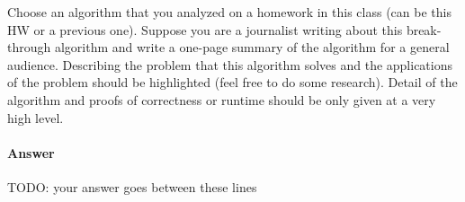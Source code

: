 \documentclass{article}
\begin{document}


\nextprob
{}

Choose an algorithm that you analyzed on a homework in this class (can be this HW or a previous one).
Suppose you are a journalist writing about this break-through algorithm and write a one-page summary of the algorithm for a general audience.
Describing the problem that this algorithm solves and the applications of the problem should be highlighted (feel free to do some research).
Detail of the algorithm and proofs of correctness or runtime should be only given at a very high level.

\paragraph{Answer}


TODO: your answer goes between these lines



\newpage



\end{document}
